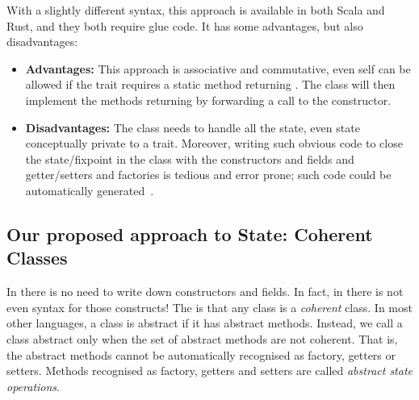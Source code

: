 \noindent 

With a slightly different syntax, this approach is available in both Scala and Rust, and they both require glue code.
It has some advantages, but also disadvantages: 

\begin{itemize}

\item {\bf Advantages:} This approach is associative and commutative, even self 
  can be allowed if the trait requires a static method
  returning \Q@This@. The class will then implement the methods returning \Q@This@
  by forwarding a call to the constructor.
  
\item {\bf Disadvantages:}
The class needs to handle all the state, even state conceptually
   private to a trait. 
 Moreover, writing such obvious code to close
  the state/fixpoint in the class 
   with the constructors and fields and getter/setters and factories is tedious and error prone; such code could be automatically
   generated~\cite{wang2016classless}.
\end{itemize}

\subsection{Our proposed approach to State: Coherent Classes}

In \name there is no need to write down constructors and fields. In fact, in
\name there is not even syntax for those constructs!  The  is that
any class 
%
is a
\emph{coherent} class.  In most other languages, a class is
abstract if it has abstract methods.  Instead, we call a class
abstract only when the set of abstract methods are not coherent. That
is, the abstract methods cannot be automatically recognised
as factory, getters or setters. Methods recognised as factory, getters and setters are called
\emph{abstract state operations}.
  
